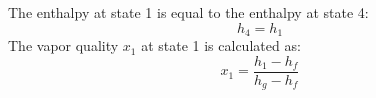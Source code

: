 The enthalpy at state 1 is equal to the enthalpy at state 4:  
\[
h_4 = h_1
\]  
The vapor quality \( x_1 \) at state 1 is calculated as:  
\[
x_1 = \frac{h_1 - h_f}{h_g - h_f}
\]